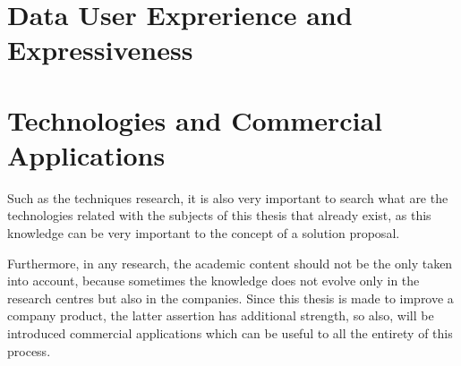 \section{Data User Exprerience and Expressiveness}
\label{sec:data_user_experience_and_expressiveness}

\section{Technologies and Commercial Applications}
\label{sec:technologies_and_commercial_applications}
Such as the techniques research, it is also very important to search what are the technologies related with the subjects of this thesis that already exist, as this knowledge can be very important to the concept of a solution proposal.

Furthermore, in any research, the academic content should not be the only taken into account, because sometimes the knowledge does not evolve only in the research centres but also in the companies. Since this thesis is made to improve a company product, the latter assertion has additional strength, so also, will be introduced commercial applications which can be useful to all the entirety of this process.